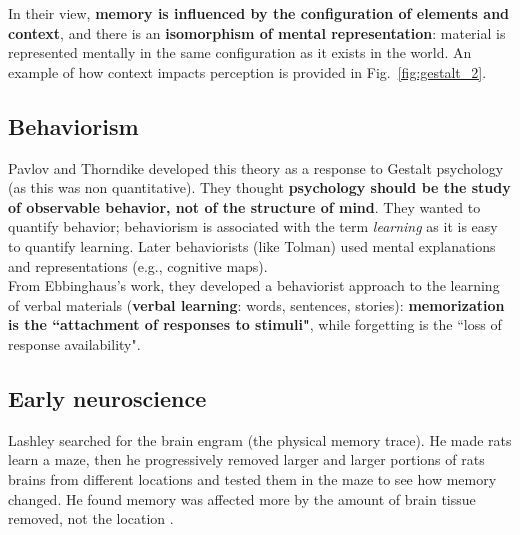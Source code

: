 In their view, \textbf{memory is influenced by the configuration of elements and context}, and there is an \textbf{isomorphism of mental representation}: material is represented mentally in the same configuration as it exists in the world. An example of how context impacts perception is provided in Fig.~\ref{fig:gestalt_2}.\\


\subsection{Behaviorism}
Pavlov and Thorndike developed this theory as a response to Gestalt psychology (as this was non quantitative). They thought \textbf{psychology should be the study of observable behavior, not of the structure of mind}. They wanted to quantify behavior; behaviorism is associated with the term \textit{learning} as it is easy to quantify learning. Later behaviorists (like Tolman) used mental explanations and representations (e.g., cognitive maps).\\
From Ebbinghaus's work, they developed a behaviorist approach to the learning of verbal materials (\textbf{verbal learning}: words, sentences, stories): \textbf{memorization is the ``attachment of responses to stimuli"}, while forgetting is the ``loss of response availability".

\subsection{Early neuroscience}
Lashley searched for the brain engram (the physical memory trace). He made rats learn a maze, then he progressively removed larger and larger portions of rats brains from different locations and tested them in the maze to see how memory changed. He found memory was affected more by the amount of brain tissue removed, not the location \notet.


